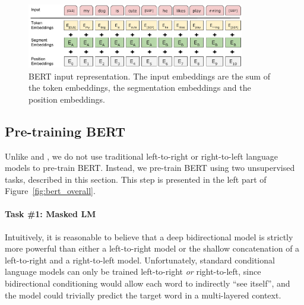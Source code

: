 \begin{figure}[ht]
\begin{center}
\hspace{-0.2in}
\includegraphics[width=360px]{Input_Emebeddings.pdf}
\end{center}
\caption{BERT input representation. The input embeddings are the sum of the token embeddings, the segmentation embeddings and the position embeddings.}
\label{fig:input_embeddings}
\end{figure}




\subsection{Pre-training BERT}
\label{sec:pretraining_tasks}

Unlike \citet{peters-etal:2018:_deep} and \citet{radford-etal:2018}, we do not use traditional left-to-right or right-to-left language models to pre-train BERT. Instead, we pre-train BERT using two unsupervised tasks, described in this section. This step
is presented in the left part of Figure~\ref{fig:bert_overall}.

\paragraph{Task \#1: Masked LM}
Intuitively, it is reasonable to believe that a deep bidirectional model is strictly more powerful than either a left-to-right model or the shallow concatenation of a left-to-right and a right-to-left model. Unfortunately, standard conditional language models can only be trained left-to-right {\it or} right-to-left, since bidirectional conditioning would 
allow each word to indirectly ``see itself'', and
the model could trivially predict the target word in a multi-layered context.

